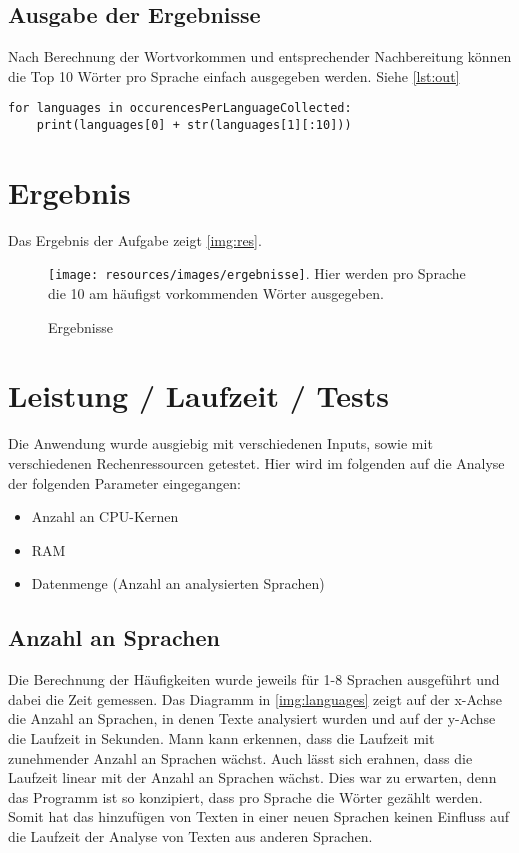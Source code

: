 \documentclass[chapterprefix=true, 12pt, a4paper, oneside, parskip=half, listof=totoc, bibliography=totoc, numbers=noendperiod]{scrbook}
\begin{document}
 
\subsection{Ausgabe der Ergebnisse}
Nach Berechnung der Wortvorkommen und entsprechender Nachbereitung können die Top 10 Wörter pro Sprache einfach ausgegeben werden. Siehe \autoref{lst:out}



 \begin{lstlisting}[caption={Ergebnisse ausgeben}, captionpos=b, label={lst:out}]
for languages in occurencesPerLanguageCollected:
    print(languages[0] + str(languages[1][:10]))
\end{lstlisting}


\section{Ergebnis}

Das Ergebnis der Aufgabe zeigt \autoref{img:res}. 
\begin{figure}[H]
	\texttt{[image: resources/images/ergebnisse]}. Hier werden pro Sprache die 10 am häufigst vorkommenden Wörter ausgegeben. 
	\caption{Ergebnisse}
	\label{img:res}
\end{figure}

\section{Leistung / Laufzeit / Tests}
Die Anwendung wurde ausgiebig mit verschiedenen Inputs, sowie mit verschiedenen Rechenressourcen getestet. Hier wird im folgenden auf die Analyse der folgenden Parameter eingegangen:
\begin{itemize}
    \item Anzahl an CPU-Kernen
    \item RAM
    \item Datenmenge (Anzahl an analysierten Sprachen)
\end{itemize}

\subsection{Anzahl an Sprachen}
Die Berechnung der Häufigkeiten wurde jeweils für 1-8 Sprachen ausgeführt und dabei die Zeit gemessen. Das Diagramm in \autoref{img:languages} zeigt auf der x-Achse die Anzahl an Sprachen, in denen Texte analysiert wurden und auf der y-Achse die Laufzeit in Sekunden. Mann kann erkennen, dass die Laufzeit mit zunehmender Anzahl an Sprachen wächst. Auch lässt sich erahnen, dass die Laufzeit linear mit der Anzahl an Sprachen wächst. Dies war zu erwarten, denn das Programm ist so konzipiert, dass pro Sprache die Wörter gezählt werden. Somit hat das hinzufügen von Texten in einer neuen Sprachen keinen Einfluss auf die Laufzeit der Analyse von Texten aus anderen Sprachen. 
\end{document}
